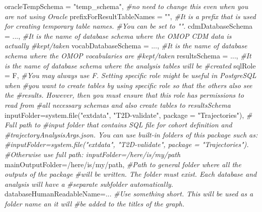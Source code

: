 \documentclass[
]{article}
\newenvironment{Shaded}{\begin{snugshade}}{\end{snugshade}}
\newcommand{\AttributeTok}[1]{\textcolor[rgb]{0.77,0.63,0.00}{#1}}
\newcommand{\CommentTok}[1]{\textcolor[rgb]{0.56,0.35,0.01}{\textit{#1}}}
\newcommand{\FunctionTok}[1]{\textcolor[rgb]{0.00,0.00,0.00}{#1}}
\newcommand{\NormalTok}[1]{#1}
\newcommand{\OtherTok}[1]{\textcolor[rgb]{0.56,0.35,0.01}{#1}}
\newcommand{\StringTok}[1]{\textcolor[rgb]{0.31,0.60,0.02}{#1}}
\begin{document}
\begin{Shaded}
\begin{Highlighting}[]
\NormalTok{oracleTempSchema }\OtherTok{=} \StringTok{"temp\_schema"}\NormalTok{, }\CommentTok{\#no need to change this even when you are not using Oracle}
\NormalTok{prefixForResultTableNames }\OtherTok{=} \StringTok{""}\NormalTok{, }\CommentTok{\#It is a prefix that is used for creating temporary table names.}
             \CommentTok{\#You can be set to "".}
\NormalTok{cdmDatabaseSchema }\OtherTok{=} \StringTok{\textquotesingle{}...\textquotesingle{}}\NormalTok{, }\CommentTok{\#It is the name of database schema where the OMOP CDM data is actually}
             \CommentTok{\#kept/taken}
\NormalTok{vocabDatabaseSchema }\OtherTok{=} \StringTok{\textquotesingle{}...\textquotesingle{}}\NormalTok{, }\CommentTok{\#It is the name of database schema where the OMOP vocabularies are}
             \CommentTok{\#kept/taken}
\NormalTok{resultsSchema }\OtherTok{=} \StringTok{\textquotesingle{}...\textquotesingle{}}\NormalTok{, }\CommentTok{\#It is the name of database schema where the analysis tables will be}
             \CommentTok{\#created}
\NormalTok{sqlRole }\OtherTok{=}\NormalTok{ F, }\CommentTok{\#You may always use \textquotesingle{}F\textquotesingle{}. Setting specific role might be useful in PostgreSQL when}
             \CommentTok{\#you want to create tables by using specific role so that the others also see the}
             \CommentTok{\#results. However, then you must ensure that this role has permissions to read from}
             \CommentTok{\#all necessary schemas and also create tables to resultsSchema}
\NormalTok{inputFolder}\OtherTok{=}\FunctionTok{system.file}\NormalTok{(}\StringTok{"extdata"}\NormalTok{, }\StringTok{"T2D{-}validate"}\NormalTok{, }\AttributeTok{package =} \StringTok{"Trajectories"}\NormalTok{), }\CommentTok{\# Full path to}
             \CommentTok{\#input folder that contains SQL file for cohort definition and}
             \CommentTok{\#trajectoryAnalysisArgs.json. You can use built{-}in folders of this package such as:}
             \CommentTok{\#inputFolder=system.file("extdata", "T2D{-}validate", package = "Trajectories").}
             \CommentTok{\#Otherwise use full path: inputFolder=\textquotesingle{}/here/is/my/path\textquotesingle{}}
\NormalTok{mainOutputFolder}\OtherTok{=}\StringTok{\textquotesingle{}/here/is/my/path\textquotesingle{}}\NormalTok{, }\CommentTok{\#Path to general folder where all the outputs of the package}
             \CommentTok{\#will be written. The folder must exist. Each database and analysis will have a}
             \CommentTok{\#separate subfolder automatically.}
\NormalTok{databaseHumanReadableName}\OtherTok{=}\StringTok{\textquotesingle{}...\textquotesingle{}} \CommentTok{\#Use something short. This will be used as a folder name an it will}
             \CommentTok{\#be added to the titles of the graph.}
\end{Highlighting}
\end{Shaded}
\end{document}
